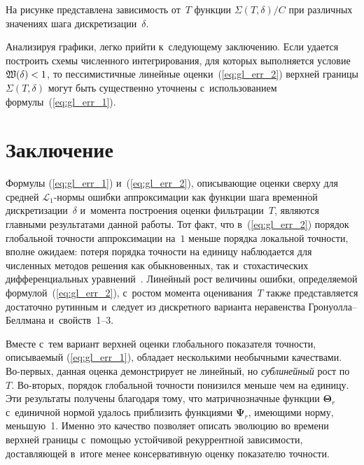 \begin{multicols}{2}




 На рисунке представлена за\-ви\-си\-мость от~$T$  функции ${\Sigma 
(T,\delta)}/{C}$ при различных значениях шага дискретизации~$\delta$.



 
Анализируя графики, легко прийти к~сле\-ду\-юще\-му заключению.  Если удается 
по\-стро\-ить схемы числен\-но\-го интегрирования, для которых выполняется условие  
$\mathfrak{W}(\delta) \hm< 1$, то пессимистичные линейные оценки~(\ref{eq:gl_err_2}) 
верх\-ней границы $\Sigma (T,\delta)$ могут быть существенно 
уточ\-не\-ны с~использованием формулы~(\ref{eq:gl_err_1}).



 \section{Заключение}
 
 Формулы (\ref{eq:gl_err_1}) и~(\ref{eq:gl_err_2}), описывающие оценки сверху 
для средней $\mathcal{L}_1$-нор\-мы ошибки аппроксимации как функции шага 
временн$\acute{\mbox{о}}$й дискретизации~$\delta$ и~момента по\-стро\-ения оценки фильт\-ра\-ции~$T$, 
являются главными результатами данной работы. Тот факт, что в~(\ref{eq:gl_err_2}) порядок глобальной точ\-ности аппроксимации 
на~$1$  меньше 
порядка локальной точ\-ности, вполне ожидаем: потеря порядка точ\-ности на единицу 
наблюдается для чис\-лен\-ных методов решения как обыкновенных, так и~сто\-ха\-сти\-че\-ских 
дифференциальных уравнений~\cite{KP_92}. Линейный рост величины ошиб\-ки, 
опре\-де\-ля\-емой формулой~(\ref{eq:gl_err_2}), с~рос\-том момента оценивания~$T$ так\-же 
представляется достаточно рутинным и~следует из дискретного варианта неравенства 
Гро\-ну\-ол\-ла--Бел\-лма\-на и~свойств~1--3.

Вместе с~тем вариант верхней оценки глобального показателя точ\-ности, опи\-сы\-ва\-емый 
(\ref{eq:gl_err_1}), обладает несколькими необычными качествами. Во-пер\-вых, 
данная оцен\-ка демонстрирует не линейный, но \textit{сублинейный} рост по~$T$. 
Во-вто\-рых, порядок глобальной точ\-ности понизился меньше чем на единицу. Эти 
результаты получены благодаря тому, что матричнозначные функции 
$\mathbf{\Theta}_r$ с~единичной нормой удалось при\-бли\-зить функциями 
$\mathbf{\Psi}_r$, име\-ющи\-ми норму, меньшую~1. Именно это качество позволяет 
описать эволюцию во времени верх\-ней границы с~по\-мощью устойчивой рекуррентной 
зависимости, до\-став\-ля\-ющей в~итоге менее консервативную оцен\-ку показателю 
точ\-ности.


\end{multicols}
